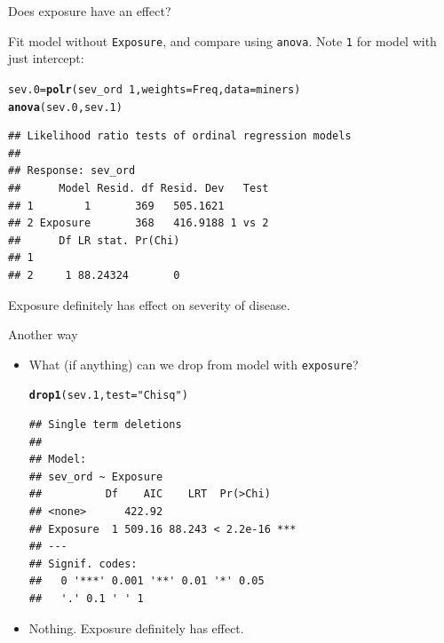 \documentclass[unknownkeysallowed]{beamer}\usepackage[]{graphicx}\usepackage[]{color}
\makeatletter
\newcommand{\hlnum}[1]{\textcolor[rgb]{0.686,0.059,0.569}{#1}}%
\newcommand{\hlstr}[1]{\textcolor[rgb]{0.192,0.494,0.8}{#1}}%
\newcommand{\hlopt}[1]{\textcolor[rgb]{0,0,0}{#1}}%
\newcommand{\hlstd}[1]{\textcolor[rgb]{0.345,0.345,0.345}{#1}}%
\newcommand{\hlkwb}[1]{\textcolor[rgb]{0.69,0.353,0.396}{#1}}%
\newcommand{\hlkwc}[1]{\textcolor[rgb]{0.333,0.667,0.333}{#1}}%
\newcommand{\hlkwd}[1]{\textcolor[rgb]{0.737,0.353,0.396}{\textbf{#1}}}%
\newenvironment{kframe}{%
 \def\at@end@of@kframe{}%
 \ifinner\ifhmode%
  \def\at@end@of@kframe{\end{minipage}}%
  \begin{minipage}{\columnwidth}%
 \fi\fi%
 \def\FrameCommand##1{\hskip\@totalleftmargin \hskip-\fboxsep
 \colorbox{shadecolor}{##1}\hskip-\fboxsep
     \hskip-\linewidth \hskip-\@totalleftmargin \hskip\columnwidth}%
 \MakeFramed {\advance\hsize-\width
   \@totalleftmargin\z@ \linewidth\hsize
   \@setminipage}}%
 {\par\unskip\endMakeFramed%
 \at@end@of@kframe}
\newenvironment{knitrout}{}{} %
\makeatother
\begin{document}
\begin{frame}[fragile]{Does exposure have an effect?}
  
  Fit model without \texttt{Exposure}, and compare
using \texttt{anova}. Note \texttt{1} for model with just intercept:



\begin{knitrout}\footnotesize
{}\color{fgcolor}\begin{kframe}
\begin{alltt}
\hlstd{sev.0}\hlkwb{=}\hlkwd{polr}\hlstd{(sev_ord}\hlopt{~}\hlnum{1}\hlstd{,}\hlkwc{weights}\hlstd{=Freq,}\hlkwc{data}\hlstd{=miners)}
\hlkwd{anova}\hlstd{(sev.0,sev.1)}
\end{alltt}
\begin{verbatim}
## Likelihood ratio tests of ordinal regression models
## 
## Response: sev_ord
##      Model Resid. df Resid. Dev   Test
## 1        1       369   505.1621       
## 2 Exposure       368   416.9188 1 vs 2
##      Df LR stat. Pr(Chi)
## 1                       
## 2     1 88.24324       0
\end{verbatim}
\end{kframe}
\end{knitrout}


Exposure definitely has effect on severity of disease. 

  
\end{frame}

\begin{frame}[fragile]{Another way}
  
  \begin{itemize}
  \item What (if anything) can we drop from model with \texttt{exposure}?
    
\begin{knitrout}
\color{fgcolor}\begin{kframe}
\begin{alltt}
\hlkwd{drop1}\hlstd{(sev.1,}\hlkwc{test}\hlstd{=}\hlstr{"Chisq"}\hlstd{)}
\end{alltt}
\begin{verbatim}
## Single term deletions
## 
## Model:
## sev_ord ~ Exposure
##          Df    AIC    LRT  Pr(>Chi)    
## <none>      422.92                     
## Exposure  1 509.16 88.243 < 2.2e-16 ***
## ---
## Signif. codes:  
##   0 '***' 0.001 '**' 0.01 '*' 0.05
##   '.' 0.1 ' ' 1
\end{verbatim}
\end{kframe}
\end{knitrout}

\item Nothing. Exposure definitely has effect.
  \end{itemize}
  
\end{frame}
\end{document}
